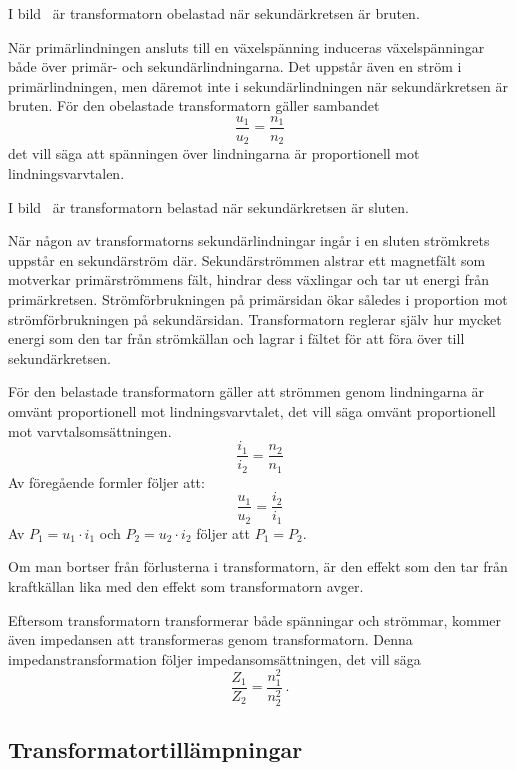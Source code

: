 
I bild~ är transformatorn obelastad när sekundärkretsen är
bruten.

När primärlindningen ansluts till en växelspänning induceras växelspänningar
både över primär- och sekundärlindningarna.
Det uppstår även en ström i primärlindningen, men däremot inte i
sekundärlindningen när sekundärkretsen är bruten.
För den obelastade transformatorn gäller sambandet
\[\dfrac{u_1}{u_2} = \dfrac{n_1}{n_2}\]
det vill säga att spänningen över lindningarna är
proportionell mot lindningsvarvtalen.

I bild~ är transformatorn belastad när sekundärkretsen
är sluten.

När någon av transformatorns sekundärlindningar ingår i en sluten strömkrets 
uppstår en sekundärström där.
%
Sekundärströmmen alstrar ett magnetfält som motverkar primärströmmens fält,
hindrar dess växlingar och tar ut energi från primärkretsen.
%
Strömförbrukningen på primärsidan ökar således i proportion mot
strömförbrukningen på sekundärsidan. Transformatorn reglerar själv hur mycket
energi som den tar från strömkällan och lagrar i fältet för att föra över
till sekundärkretsen.

För den belastade transformatorn gäller att strömmen genom lindningarna är
omvänt proportionell mot lindningsvarvtalet, det vill säga omvänt proportionell 
mot varvtalsomsättningen.
\[\dfrac{i_1}{i_2} = \dfrac{n_2}{n_1}\]
Av föregående formler följer att:
\[\dfrac{u_1}{u_2} = \dfrac{i_2}{i_1}\]
Av \(P_1 = u_1 \cdot i_1\) och \(P_2 = u_2 \cdot i_2\) följer att \(P_1 = P_2\).

Om man bortser från förlusterna i transformatorn, är den effekt som den tar
från kraftkällan lika med den effekt som transformatorn avger.

Eftersom transformatorn transformerar både spänningar och strömmar, kommer
även impedansen att transformeras genom transformatorn.
Denna impedanstransformation följer impedansomsättningen, det vill säga
\[\dfrac{Z_1}{Z_2} = \dfrac{n_1^2}{n_2^2}~.\]

\subsection{Transformatortillämpningar}

